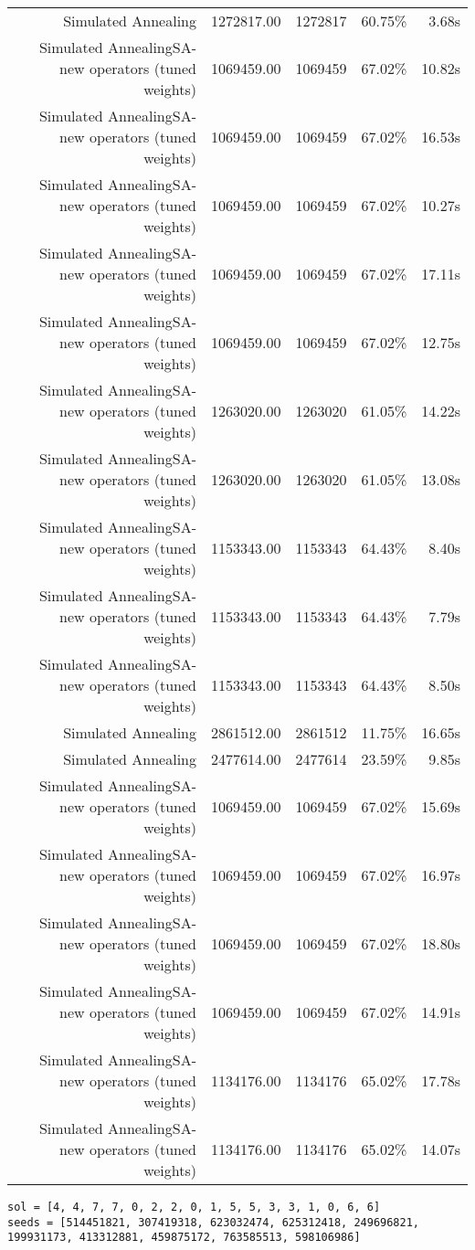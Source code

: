 \begin{table}[ht]
\begin{tabular}{|r|r|r|r|r|}
Simulated Annealing & 1272817.00 & 1272817 & 60.75\% & 3.68s\\
Simulated AnnealingSA-new operators (tuned weights) & 1069459.00 & 1069459 & 67.02\% & 10.82s\\
Simulated AnnealingSA-new operators (tuned weights) & 1069459.00 & 1069459 & 67.02\% & 16.53s\\
Simulated AnnealingSA-new operators (tuned weights) & 1069459.00 & 1069459 & 67.02\% & 10.27s\\
Simulated AnnealingSA-new operators (tuned weights) & 1069459.00 & 1069459 & 67.02\% & 17.11s\\
Simulated AnnealingSA-new operators (tuned weights) & 1069459.00 & 1069459 & 67.02\% & 12.75s\\
Simulated AnnealingSA-new operators (tuned weights) & 1263020.00 & 1263020 & 61.05\% & 14.22s\\
Simulated AnnealingSA-new operators (tuned weights) & 1263020.00 & 1263020 & 61.05\% & 13.08s\\
Simulated AnnealingSA-new operators (tuned weights) & 1153343.00 & 1153343 & 64.43\% & 8.40s\\
Simulated AnnealingSA-new operators (tuned weights) & 1153343.00 & 1153343 & 64.43\% & 7.79s\\
Simulated AnnealingSA-new operators (tuned weights) & 1153343.00 & 1153343 & 64.43\% & 8.50s\\
Simulated Annealing & 2861512.00 & 2861512 & 11.75\% & 16.65s\\
Simulated Annealing & 2477614.00 & 2477614 & 23.59\% & 9.85s\\
Simulated AnnealingSA-new operators (tuned weights) & 1069459.00 & 1069459 & 67.02\% & 15.69s\\
Simulated AnnealingSA-new operators (tuned weights) & 1069459.00 & 1069459 & 67.02\% & 16.97s\\
Simulated AnnealingSA-new operators (tuned weights) & 1069459.00 & 1069459 & 67.02\% & 18.80s\\
Simulated AnnealingSA-new operators (tuned weights) & 1069459.00 & 1069459 & 67.02\% & 14.91s\\
Simulated AnnealingSA-new operators (tuned weights) & 1134176.00 & 1134176 & 65.02\% & 17.78s\\
Simulated AnnealingSA-new operators (tuned weights) & 1134176.00 & 1134176 & 65.02\% & 14.07s\\
\end{tabular}%
\end{table}
\begin{lstlisting}[label={lst:call7vehicle3},caption=Optimal solution call\_7\_vehicle\_3]
sol = [4, 4, 7, 7, 0, 2, 2, 0, 1, 5, 5, 3, 3, 1, 0, 6, 6]
seeds = [514451821, 307419318, 623032474, 625312418, 249696821, 199931173, 413312881, 459875172, 763585513, 598106986]
\end{lstlisting}%
\clearpage



